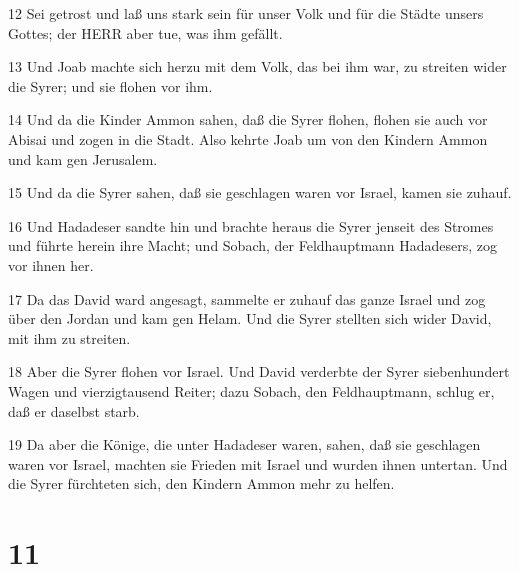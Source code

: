 \par 12 Sei getrost und laß uns stark sein für unser Volk und für die Städte unsers Gottes; der HERR aber tue, was ihm gefällt.
\par 13 Und Joab machte sich herzu mit dem Volk, das bei ihm war, zu streiten wider die Syrer; und sie flohen vor ihm.
\par 14 Und da die Kinder Ammon sahen, daß die Syrer flohen, flohen sie auch vor Abisai und zogen in die Stadt. Also kehrte Joab um von den Kindern Ammon und kam gen Jerusalem.
\par 15 Und da die Syrer sahen, daß sie geschlagen waren vor Israel, kamen sie zuhauf.
\par 16 Und Hadadeser sandte hin und brachte heraus die Syrer jenseit des Stromes und führte herein ihre Macht; und Sobach, der Feldhauptmann Hadadesers, zog vor ihnen her.
\par 17 Da das David ward angesagt, sammelte er zuhauf das ganze Israel und zog über den Jordan und kam gen Helam. Und die Syrer stellten sich wider David, mit ihm zu streiten.
\par 18 Aber die Syrer flohen vor Israel. Und David verderbte der Syrer siebenhundert Wagen und vierzigtausend Reiter; dazu Sobach, den Feldhauptmann, schlug er, daß er daselbst starb.
\par 19 Da aber die Könige, die unter Hadadeser waren, sahen, daß sie geschlagen waren vor Israel, machten sie Frieden mit Israel und wurden ihnen untertan. Und die Syrer fürchteten sich, den Kindern Ammon mehr zu helfen.

\chapter{11}

